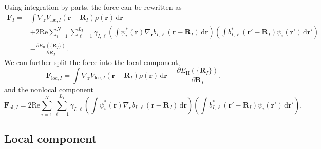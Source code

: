 \documentclass{article}
\newcommand{\bvec}[1]{\mathbf{#1}}
\newcommand{\vr}{\bvec{r}}
\newcommand{\vF}{\bvec{F}}
\newcommand{\vR}{\bvec{R}}
\renewcommand{\Re}{\mathrm{Re}}
\newcommand{\ud}{\,\mathrm{d}}
\newcommand{\II}{\mathrm{II}}
\theoremstyle{plain}
\theoremstyle{remark}
\theoremstyle{plain}
\theoremstyle{plain}
\theoremstyle{plain}
\begin{document}
Using integration by parts, the force can be rewritten as
\begin{equation}
  \begin{split}
    \vF_{I} = &\int \nabla_{\vr} V_{\text{loc},I}(\vr-\vR_{I})
    \rho(\vr) \ud \vr\\
    & + 2 \Re \sum_{i=1}^{N} \sum_{\ell=1}^{L_{I}} \gamma_{I,\ell}
    \left(\int \psi^{*}_{i}(\vr) \nabla_{\vr} b_{I,\ell}(\vr-\vR_{I}) \ud \vr \right)
    \left(\int b^{*}_{I,\ell}(\vr'-\vR_{I}) \psi_{i}(\vr') \ud \vr' \right)\\
    & -\frac{\partial E_{\II}(\{\vR_{I}\})}{\partial
  \vR_{I}}.
  \end{split}
  \label{eqn:forceHF2}
\end{equation}
We can further split the force into the local component,
\begin{equation}
 \vF_{\text{loc},I}=\int \nabla_{\vr} V_{\text{loc},I}(\vr-\vR_{I})
    \rho(\vr) \ud \vr-\frac{\partial E_{\II}(\{\vR_{I}\})}{\partial
  \vR_{I}}.
\label{eqn:force_loc}
\end{equation}
and the nonlocal component
\begin{equation}
 \vF_{\text{nl},I}= 2 \Re \sum_{i=1}^{N} \sum_{\ell=1}^{L_{I}} \gamma_{I,\ell}
    \left(\int \psi^{*}_{i}(\vr) \nabla_{\vr} b_{I,\ell}(\vr-\vR_{I}) \ud \vr \right)
    \left(\int b^{*}_{I,\ell}(\vr'-\vR_{I}) \psi_{i}(\vr') \ud \vr' \right).
\label{eqn:force_nl}
\end{equation}

\subsection{Local component}
\end{document}
